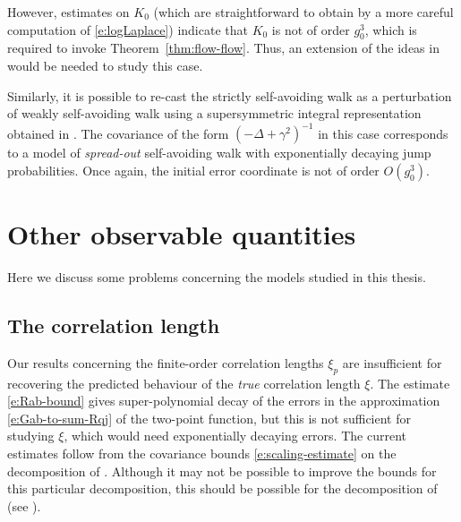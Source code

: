 However, estimates on $K_0$ (which are straightforward
to obtain by a more careful computation of \eqref{e:logLaplace}) indicate that
$K_0$ is not of order $g_0^3$, which is required to invoke Theorem~\ref{thm:flow-flow}.
Thus, an extension of the ideas in \cite{BBS-rg-flow} would be needed to study this
case.

\begin{rk}
Similarly, it is possible to re-cast the strictly self-avoiding walk as a
perturbation of weakly self-avoiding walk using a supersymmetric integral
representation obtained in \cite{BIS09}. The covariance of the form
$(-\Delta + \gamma^2)^{-1}$ in this case corresponds to a model of \emph{spread-out}
self-avoiding walk with exponentially decaying jump probabilities. Once again,
the initial error coordinate is not of order $O(g_0^3)$.
\end{rk}


\section{Other observable quantities}

Here we discuss some problems concerning the models studied in this thesis.


\subsection{The correlation length}

Our results concerning the finite-order correlation lengths $\xi_p$ are insufficient
for recovering the predicted behaviour of the \emph{true} correlation length $\xi$.
The estimate \eqref{e:Rab-bound} gives super-polynomial decay of the errors in the
approximation \eqref{e:Gab-to-sum-Rqj} of the two-point function, but this is not
sufficient for studying $\xi$, which would need exponentially decaying errors.
The current estimates follow from the covariance bounds \eqref{e:scaling-estimate}
on the decomposition of \cite{Baue13a}. Although it may not be possible to improve
the bounds for this particular decomposition, this should be possible for the
decomposition of \cite{BGM04} (see \cite[p.~445]{BGM04}).

